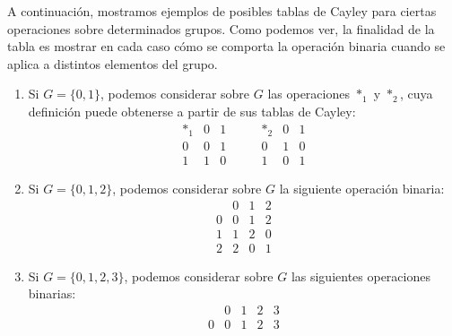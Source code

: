 \begin{ejemplo}
    A continuación, mostramos ejemplos de posibles tablas de Cayley para ciertas operaciones sobre determinados grupos. Como podemos ver, la finalidad de la tabla es mostrar en cada caso cómo se comporta la operación binaria cuando se aplica a distintos elementos del grupo.
    \begin{enumerate}
        \item Si $G=\{0,1\}$, podemos considerar sobre $G$ las operaciones $\ast_1$ y $\ast_2$, cuya definición puede obtenerse a partir de sus tablas de Cayley:
            \begin{equation*}
                \begin{array}{c|cc}
                    \ast_1 & 0 & 1 \\
                    \hline 
                    0 & 0 & 1 \\
                    1 & 1 & 0
                \end{array} \qquad 
                \begin{array}{c|cc}
                    \ast_2 & 0 & 1 \\
                    \hline 
                    0 & 1 & 0 \\
                    1 & 0 & 1
                \end{array}
            \end{equation*}
        \item Si $G=\{0,1,2\}$, podemos considerar sobre $G$ la siguiente operación binaria:
            \begin{equation*}
                \begin{array}{c|ccc}
                     & 0 & 1 & 2 \\
                     \hline
                    0 & 0 & 1 & 2 \\
                    1 & 1 & 2 & 0 \\
                    2 & 2 & 0 & 1 
                \end{array}
            \end{equation*}
        \item Si $G=\{0,1,2,3\}$, podemos considerar sobre $G$ las siguientes operaciones binarias:
            \begin{equation*}
                \begin{array}{c|cccc}
                     & 0 & 1 & 2 & 3 \\
                     \hline 
                    0 & 0 & 1 & 2 & 3\\

\end{array}
\end{equation*}
\end{enumerate}
\end{ejemplo}

